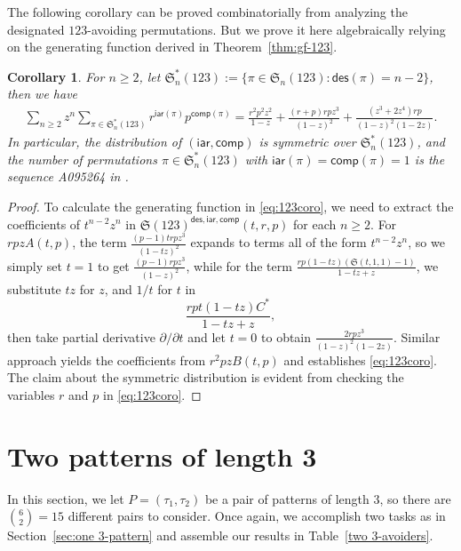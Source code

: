 \documentclass[12pt]{amsart}
\numberwithin{equation}{section}
\theoremstyle{plain}
\newtheorem{corollary}[theorem]{Corollary}
\theoremstyle{definition}
\def\des{\mathsf{des}}
\def\S{\mathfrak{S}}
\def\iar{\mathsf{iar}}
\def\comp{\mathsf{comp}}
\begin{document}
The following corollary can be proved combinatorially from analyzing the designated $123$-avoiding permutations. But we prove it here algebraically relying on the generating function derived in Theorem~\ref{thm:gf-123}.
\begin{corollary}
For $n\ge 2$, let $\S_n^{*}(123):=\{\pi\in\S_n(123):\des(\pi)=n-2\}$, then we have
\begin{align}\label{eq:123coro}
\sum_{n\ge 2}z^n\sum_{\pi\in\S_n^*(123)}r^{\iar(\pi)}p^{\comp(\pi)}=\frac{r^2p^2z^2}{1-z}+\frac{(r+p)rpz^3}{(1-z)^2}+\frac{(z^3+2z^4)rp}{(1-z)^2(1-2z)}.
\end{align}
In particular, the distribution of $(\iar,\comp)$ is symmetric over $\S_n^*(123)$, and the number of permutations $\pi\in\S_n^*(123)$ with $\iar(\pi)=\comp(\pi)=1$ is the sequence A095264 in \cite{oeis}.
\end{corollary}
\begin{proof}
To calculate the generating function in \eqref{eq:123coro}, we need to extract the coefficients of $t^{n-2}z^n$ in $\S(123)^{\des,\iar,\comp}(t,r,p)$ for each $n\ge 2$. For $rpzA(t,p)$, the term $\frac{(p-1)trpz^3}{(1-tz)^2}$ expands to terms all of the form $t^{n-2}z^n$, so we simply set $t=1$ to get $\frac{(p-1)rpz^3}{(1-z)^2}$, while for the term $\frac{rp(1-tz)(\S(t,1,1)-1)}{1-tz+z}$, we substitute $tz$ for $z$, and $1/t$ for $t$ in
$$\frac{rpt(1-tz) C^*}{1-tz+z},$$
then take partial derivative $\partial/\partial t$ and let $t=0$ to obtain $\frac{2rpz^3}{(1-z)^2(1-2z)}$. Similar approach yields the coefficients from $r^2pzB(t,p)$ and establishes \eqref{eq:123coro}. The claim about the symmetric distribution is evident from checking the variables $r$ and $p$ in \eqref{eq:123coro}.
\end{proof}


\section{Two patterns of length 3}\label{sec3: two 3-patterns}
In this section, we let $P=(\tau_1,\tau_2)$ be a pair of patterns of length $3$, so there are $\binom{6}{2}=15$ different pairs to consider. Once again, we accomplish two tasks as in Section~\ref{sec:one 3-pattern} and assemble our results in Table~\ref{two 3-avoiders}.
\end{document}
